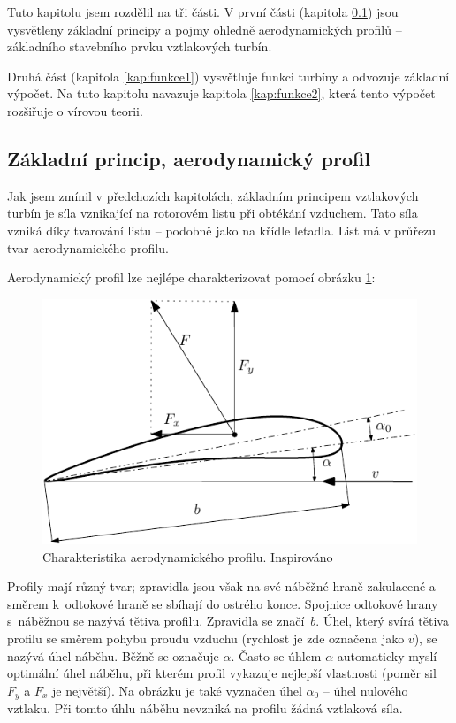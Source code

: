 	Tuto kapitolu jsem rozdělil na tři části. V první části (kapitola \ref{kap:zakladprinc}) jsou vysvětleny základní principy a pojmy ohledně aerodynamických profilů – základního stavebního prvku vztlakových turbín.
	
	Druhá část (kapitola \ref{kap:funkce1}) vysvětluje funkci turbíny a odvozuje základní výpočet. Na tuto kapitolu navazuje kapitola \ref{kap:funkce2}, která tento výpočet rozšiřuje o vírovou teorii.
	
	\subsection{Základní princip, aerodynamický profil}\label{kap:zakladprinc}
	Jak jsem zmínil v předchozích kapitolách, základním principem vztlakových turbín je síla vznikající na rotorovém listu při obtékání vzduchem. Tato síla vzniká díky tvarování listu – podobně jako na křídle letadla. List má v průřezu tvar aerodynamického profilu.
	
	Aerodynamický profil lze nejlépe charakterizovat pomocí obrázku \ref{obr.profil}:
	
	\begin{figure}[H]
		\centering
		\includegraphics[]{obrazky/profil.pdf}
		\caption{Charakteristika aerodynamického profilu. Inspirováno \cite{Rychetnik:Motory}}
		\label{obr.profil}
	\end{figure}
	
	Profily mají různý tvar; zpravidla jsou však na své náběžné hraně zakulacené a směrem k~odtokové hraně se sbíhají do ostrého konce. Spojnice odtokové hrany s~náběžnou se nazývá tětiva profilu. Zpravidla se značí~$b$. Úhel, který svírá tětiva profilu se směrem pohybu proudu vzduchu (rychlost je zde označena jako $v$), se nazývá úhel náběhu. Běžně se označuje $\alpha$. Často se úhlem $\alpha$ automaticky myslí optimální úhel náběhu, při kterém profil vykazuje nejlepší vlastnosti (poměr sil $F_y$ a $F_x$ je největší). Na obrázku je také vyznačen úhel $\alpha _0$ – úhel nulového vztlaku. Při tomto úhlu náběhu nevzniká na profilu žádná vztlaková síla\cite{Rychetnik:Motory}.
	
